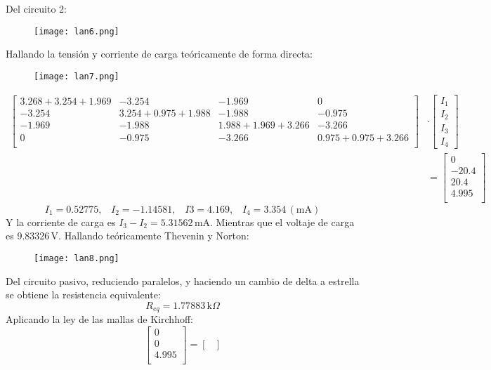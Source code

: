 \documentclass[a4paper,11pt]{report}
\begin{document}
\begin{enumerate}[label=\arabic*),font=\bfseries]
Del circuito 2:
\begin{figure}[H]
\centering
\texttt{[image: lan6.png]}
\end{figure}
Hallando la tensión y corriente de carga teóricamente de forma directa:
\begin{figure}[H]
\centering
\texttt{[image: lan7.png]}
\end{figure}
\begin{align*}
\begin{bmatrix}
3.268+3.254+1.969 & -3.254 & -1.969 & 0 \\
-3.254 & 3.254+0.975+1.988 & -1.988 & -0.975 \\
-1.969 & -1.988 & 1.988+1.969+3.266 & -3.266 \\
0 & -0.975 & -3.266 & 0.975+0.975+3.266 \\
\end{bmatrix} &\cdot \begin{bmatrix}
I_{1} \\
I_{2} \\
I_{3} \\
I_{4}
\end{bmatrix}\\
&=\begin{bmatrix}
0\\
-20.4 \\
20.4 \\
4.995 \\
\end{bmatrix}
\end{align*}
$$
I_{1} = 0.52775, \hspace{10pt} I_{2} = -1.14581, \hspace{10pt} I{3} = 4.169, \hspace{10pt} I_{4} = 3.354 \, (\mathrm{mA})
$$
Y la corriente de carga es $I_{3} - I_{2} = 5.31562\,$mA. Mientras que el voltaje de carga es 9.83326\,V.
Hallando teóricamente Thevenin y Norton:
\begin{figure}[H]
\centering
\texttt{[image: lan8.png]}
\end{figure}
Del circuito pasivo, reduciendo paralelos, y haciendo un cambio de delta a estrella se obtiene la resistencia equivalente:
$$
R_{eq} = 1.77883\,\mathrm{k}\Omega
$$
Aplicando la ley de las mallas de Kirchhoff:
$$
\begin{bmatrix}
0\\
0 \\
4.995 \\
\end{bmatrix} =  \begin{bmatrix}

\end{bmatrix}$$
\end{enumerate}
\end{document}
